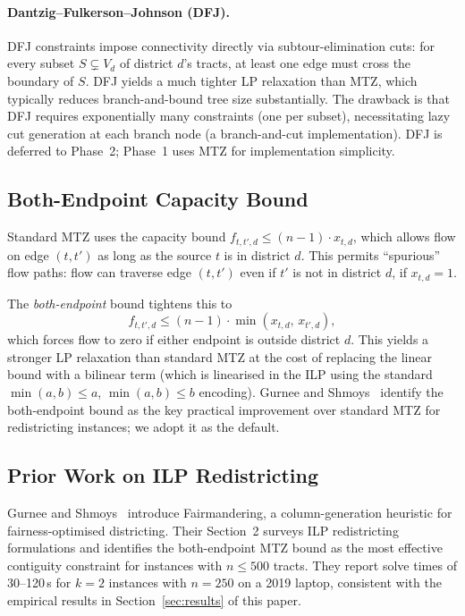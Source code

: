 \paragraph{Dantzig--Fulkerson--Johnson (DFJ).}
DFJ constraints impose connectivity directly via subtour-elimination
cuts: for every subset $S \subsetneq V_d$ of district $d$'s tracts,
at least one edge must cross the boundary of $S$.
DFJ yields a much tighter LP relaxation than MTZ, which typically reduces
branch-and-bound tree size substantially.
The drawback is that DFJ requires exponentially many constraints
(one per subset), necessitating lazy cut generation at each branch node
(a branch-and-cut implementation).
DFJ is deferred to Phase~2; Phase~1 uses MTZ for implementation simplicity.

\subsection{Both-Endpoint Capacity Bound}

Standard MTZ uses the capacity bound $f_{t,t',d} \leq (n-1) \cdot x_{t,d}$,
which allows flow on edge $(t, t')$ as long as the source $t$ is in
district $d$.
This permits ``spurious'' flow paths: flow can traverse edge $(t, t')$
even if $t'$ is not in district $d$, if $x_{t,d} = 1$.

The \emph{both-endpoint} bound tightens this to
\[
  f_{t,t',d} \leq (n-1) \cdot \min(x_{t,d},\, x_{t',d}),
\]
which forces flow to zero if either endpoint is outside district $d$.
This yields a stronger LP relaxation than standard MTZ at the cost of
replacing the linear bound with a bilinear term (which is linearised
in the ILP using the standard $\min(a,b) \leq a$, $\min(a,b) \leq b$
encoding).
Gurnee and Shmoys~\citeyear{gurnee2021} identify the both-endpoint bound
as the key practical improvement over standard MTZ for redistricting
instances; we adopt it as the default.

\subsection{Prior Work on ILP Redistricting}

Gurnee and Shmoys~\citeyear{gurnee2021} introduce Fairmandering, a
column-generation heuristic for fairness-optimised districting.
Their Section~2 surveys ILP redistricting formulations and identifies
the both-endpoint MTZ bound as the most effective contiguity constraint
for instances with $n \leq 500$ tracts.
They report solve times of 30--120\,s for $k=2$ instances with $n=250$
on a 2019 laptop, consistent with the empirical results in
Section~\ref{sec:results} of this paper.

